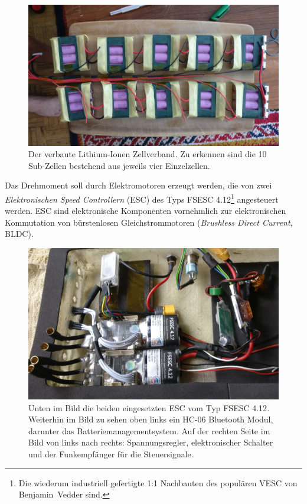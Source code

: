 			\begin{figure}[h]
				\centering
				\includegraphics[width=.9\textwidth]{Footage/Pictures/Battery pack.jpg}
				\caption[Der verbaute Lithium-Ionen Zellverband]{Der verbaute Lithium-Ionen Zellverband. Zu erkennen sind die 10 Sub-Zellen bestehend aus jeweils vier Einzelzellen.}\label{fig:battery pack}
			\end{figure}\par
			Das Drehmoment soll durch Elektromotoren erzeugt werden, die von zwei \textit{Elektronischen Speed Controllern} (ESC) des Typs \textsc{FSESC 4.12}\footnote{Die wiederum industriell gefertigte 1:1 Nachbauten des populären \textsc{VESC} von Benjamin~Vedder sind.} angesteuert werden.
			ESC sind elektronische Komponenten vornehmlich zur elektronischen Kommutation von bürstenlosen Gleichstrommotoren (\textit{Brushless Direct Current}, BLDC).
			\begin{figure}[h]
				\centering
				\includegraphics[width=.9\textwidth]{Footage/Pictures/Electronics.jpg}
				\caption[Eingesetzte ESC]{Unten im Bild die beiden eingesetzten ESC vom Typ \textsc{FSESC 4.12}. Weiterhin im Bild zu sehen oben links ein HC-06 Bluetooth Modul, darunter das Batteriemanagementsystem. Auf der rechten Seite im Bild von links nach rechts: Spannungsregler, elektronischer Schalter und der Funkempfänger für die Steuersignale.}\label{fig:electronics}
			\end{figure}
